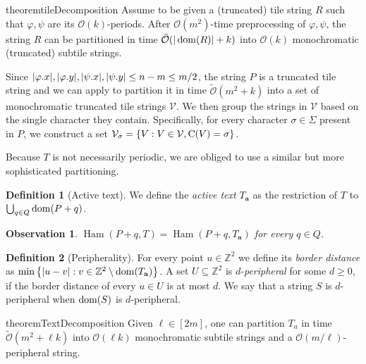 \documentclass[11pt, letterpaper]{article}
\theoremstyle{plain}
\newtheorem{observation}{Observation}
\theoremstyle{definition}
\newtheorem{definition}{Definition}
\theoremstyle{remark}
\newcommand{\Z}{\mathbb{Z}}
\renewcommand{\O}{\mathcal{O}}
\newcommand{\tO}{\tilde{\mathcal{O}}}
\newcommand{\V}{\mathcal{V}}
\renewcommand{\phi}{\varphi}
\newcommand{\set}[1]{\left\lbrace #1 \right\rbrace}
\DeclareMathOperator*{\Ham}{Ham}
\begin{document}
\begin{restatable*}{theorem}{tileDecomposition}\label{tile_decomposition}
Assume to be given a (truncated) tile string $R$ such that $\phi, \psi$ are its $\O(k)$-periods. After $\O(m^2)$-time preprocessing of $\phi, \psi$, the string $R$ can be partitioned in time $\tO(|\d{R}| + k)$ into $\O(k)$ monochromatic (truncated) subtile strings.
\end{restatable*}

Since $|\x{\phi}|, |\y{\phi}|, |\x{\psi}|, |\y{\psi}| \le n - m \le m / 2$, the string $P$ is a truncated tile string and we can apply  to partition it in time $\tO(m^2 + k)$ into a set of monochromatic truncated tile strings $\V$. We then group the strings in $\V$ based on the single character they contain. Specifically, for every character $\sigma \in \Sigma$ present in $P$, we construct a set $\V_\sigma = \set{V : V \in \V, \getchar{V} = \sigma}$.



Because $T$ is not necessarily periodic, we are obliged to use a similar but more sophisticated partitioning.

\newcommand{\Ta}{T_\mathbf{a}}
\begin{definition}[Active text]
We define the \emph{active text} $\Ta$ as the restriction of $T$ to $\bigcup_{q \in Q} \operatorname*{dom}(P + q)$. 
\end{definition}

\begin{observation}\label{obs:active_text}
$\Ham(P + q, T) = \Ham(P + q, \Ta)$ for every $q \in Q$.
\end{observation}

\begin{definition}[Peripherality]
For every point $u \in \Z^2$ we define its \emph{border distance} as $\min\set{|u - v| : v \in \Z^2 \setminus \d{\Ta}}$. A set $U \subseteq \Z^2$ is $d$-\emph{peripheral} for some $d \ge 0$, if the border distance of every $u \in U$ is at most $d$. We say that a string $S$ is $d$-peripheral when $\operatorname*{dom}(S)$ is $d$-peripheral.
\end{definition}

\begin{restatable*}{theorem}{TextDecomposition}\label{text_decomposition}
Given $\ell \in [2m]$, one can partition $T_a$ in time $\tO(m^2 + \ell k)$ into $\O(\ell k)$ monochromatic subtile strings and a $\O(m / \ell)$-peripheral string.
\end{restatable*}
\end{document}
